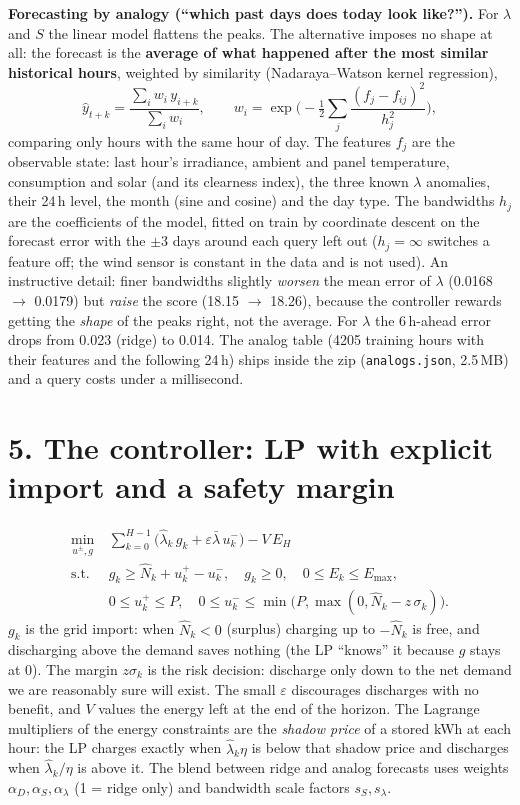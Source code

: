 \documentclass[11pt,a4paper]{article}
\begin{document}
\textbf{Forecasting by analogy (``which past days does today look like?'').} For $\lambda$ and $S$ the linear model flattens the peaks. The alternative imposes no shape at all: the forecast is the \textbf{average of what happened after the most similar historical hours}, weighted by similarity (Nadaraya--Watson kernel regression),
\[
\hat y_{t+k}=\frac{\sum_i w_i\,y_{i+k}}{\sum_i w_i},\qquad w_i=\exp\Big(-\tfrac12\sum_j \frac{(f_j-f_{ij})^2}{h_j^2}\Big),
\]
comparing only hours with the same hour of day. The features $f_j$ are the observable state: last hour's irradiance, ambient and panel temperature, consumption and solar (and its clearness index), the three known $\lambda$ anomalies, their 24\,h level, the month (sine and cosine) and the day type. The bandwidths $h_j$ are the coefficients of the model, fitted on train by coordinate descent on the forecast error with the $\pm$3 days around each query left out ($h_j=\infty$ switches a feature off; the wind sensor is constant in the data and is not used). An instructive detail: finer bandwidths slightly \emph{worsen} the mean error of $\lambda$ (0.0168 $\to$ 0.0179) but \emph{raise} the score (18.15 $\to$ 18.26), because the controller rewards getting the \emph{shape} of the peaks right, not the average. For $\lambda$ the 6\,h-ahead error drops from 0.023 (ridge) to 0.014. The analog table (4205 training hours with their features and the following 24\,h) ships inside the zip (\texttt{analogs.json}, 2.5\,MB) and a query costs under a millisecond.

\section*{5. The controller: LP with explicit import and a safety margin}
\begin{align*}
\min_{u^\pm,g}\ & \sum_{k=0}^{H-1}\big(\hat\lambda_k\,g_k+\varepsilon\bar\lambda\,u^-_k\big)-V\,E_H\\
\text{s.t.}\ & g_k\ge \hat N_k+u^+_k-u^-_k,\quad g_k\ge0,\quad 0\le E_k\le E_{\max},\\
& 0\le u^+_k\le P,\quad 0\le u^-_k\le\min\!\big(P,\max(0,\hat N_k-z\,\sigma_k)\big).
\end{align*}
$g_k$ is the grid import: when $\hat N_k<0$ (surplus) charging up to $-\hat N_k$ is free, and discharging above the demand saves nothing (the LP ``knows'' it because $g$ stays at 0). The margin $z\sigma_k$ is the risk decision: discharge only down to the net demand we are reasonably sure will exist. The small $\varepsilon$ discourages discharges with no benefit, and $V$ values the energy left at the end of the horizon. The Lagrange multipliers of the energy constraints are the \emph{shadow price} of a stored kWh at each hour: the LP charges exactly when $\hat\lambda_k\eta$ is below that shadow price and discharges when $\hat\lambda_k/\eta$ is above it. The blend between ridge and analog forecasts uses weights $\alpha_D,\alpha_S,\alpha_\lambda$ (1 = ridge only) and bandwidth scale factors $s_S,s_\lambda$.
\end{document}
